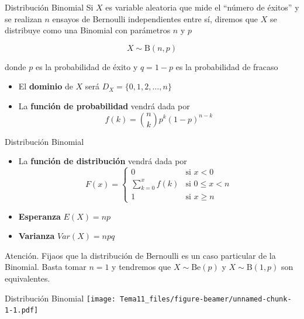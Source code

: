 \documentclass[
  ignorenonframetext,
]{beamer}
\providecommand{\tightlist}{%
  \setlength{\itemsep}{0pt}\setlength{\parskip}{0pt}}
\begin{document}
\begin{frame}{Distribución Binomial}
\protect\hypertarget{distribuciuxf3n-binomial}{}
Si \(X\) es variable aleatoria que mide el ``número de éxitos'' y se
realizan \(n\) ensayos de Bernoulli independientes entre sí, diremos que
\(X\) se distribuye como una Binomial con parámetros \(n\) y \(p\)

\[X\sim \text{B}(n,p)\]

donde \(p\) es la probabilidad de éxito y \(q = 1-p\) es la probabilidad
de fracaso

\begin{itemize}
\tightlist
\item
  El \textbf{dominio} de \(X\) será \(D_X = \{0,1,2,\dots,n\}\)
\item
  La \textbf{función de probabilidad} vendrá dada por
  \[f(k) = {n\choose k}p^k(1-p)^{n-k} \]
\end{itemize}
\end{frame}

\begin{frame}{Distribución Binomial}
\protect\hypertarget{distribuciuxf3n-binomial-1}{}
\begin{itemize}
\tightlist
\item
  La \textbf{función de distribución} vendrá dada por \[F(x) = \left\{
  \begin{array}{cl}
     0 & \text{si } x<0 
  \\ \sum_{k=0}^xf(k) & \text{si } 0\le x<n
  \\ 1 & \text{si } x\ge n
  \end{array}
  \right.\]
\item
  \textbf{Esperanza} \(E(X) = np\)
\item
  \textbf{Varianza} \(Var(X) = npq\)
\end{itemize}

Atención. Fijaos que la distribución de Bernoulli es un caso particular
de la Binomial. Basta tomar \(n=1\) y tendremos que
\(X\sim \text{Be}(p)\) y \(X\sim\text{B}(1,p)\) son equivalentes.
\end{frame}

\begin{frame}{Distribución Binomial}
\protect\hypertarget{distribuciuxf3n-binomial-2}{}
\texttt{[image: Tema11\_files/figure-beamer/unnamed-chunk-1-1.pdf]}
\end{frame}
\end{document}
